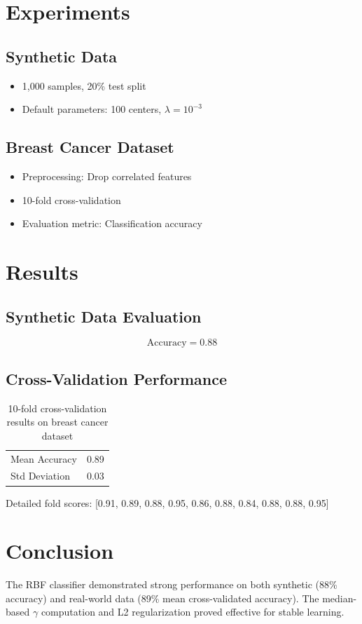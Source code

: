 \documentclass[a4paper,12pt]{article}
\begin{document}
\section*{Experiments}
\subsection*{Synthetic Data}
\begin{itemize}
  \item 1,000 samples, 20\% test split
  \item Default parameters: 100 centers, \(\lambda=10^{-3}\)
\end{itemize}

\subsection*{Breast Cancer Dataset}
\begin{itemize}
  \item Preprocessing: Drop correlated features
  \item 10-fold cross-validation
  \item Evaluation metric: Classification accuracy
\end{itemize}

\section*{Results}
\subsection*{Synthetic Data Evaluation}
\begin{equation*}
  \text{Accuracy} = 0.88
\end{equation*}

\subsection*{Cross-Validation Performance}
\begin{table}[H]
  \centering
  \begin{tabular}{|l|c|}
  \hline
  Mean Accuracy & 0.89 \\
  Std Deviation & 0.03 \\
  \hline
  \end{tabular}
  \caption{10-fold cross-validation results on breast cancer dataset}
\end{table}

Detailed fold scores: [0.91, 0.89, 0.88, 0.95, 0.86, 0.88, 0.84, 0.88, 0.88, 0.95]

\section*{Conclusion}
The RBF classifier demonstrated strong performance on both synthetic (88\% accuracy) and real-world data (89\% mean cross-validated accuracy). The median-based \(\gamma\) computation and L2 regularization proved effective for stable learning.
\end{document}

